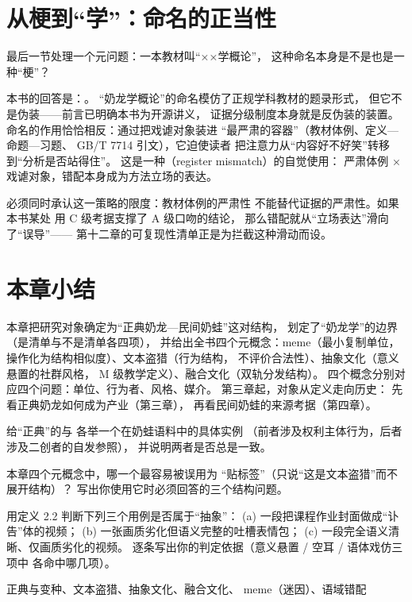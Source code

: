 \section{从梗到“学”：命名的正当性}\label{sec:02:legitimacy}

最后一节处理一个元问题：一本教材叫“××学概论”，
这种命名本身是不是也是一种“梗”？

本书的回答是：。
“奶龙学概论”的命名模仿了正规学科教材的题录形式，
但它不是伪装——前言已明确本书为开源讲义，
证据分级制度本身就是反伪装的装置。
命名的作用恰恰相反：通过把戏谑对象装进
“最严肃的容器”（教材体例、定义—命题—习题、
GB/T 7714 引文\cite{gbt7714_2015}），它迫使读者
把注意力从“内容好不好笑”转移到“分析是否站得住”。
这是一种（register mismatch）的自觉使用：
严肃体例 × 戏谑对象，错配本身成为方法立场的表达。

必须同时承认这一策略的限度：教材体例的严肃性
不能替代证据的严肃性。如果本书某处
用 C 级考据支撑了 A 级口吻的结论，
那么错配就从“立场表达”滑向了“误导”——
第十二章的可复现性清单正是为拦截这种滑动而设。

\section{本章小结}\label{sec:02:summary}

本章把研究对象确定为“正典奶龙—民间奶蛙”这对结构，
划定了“奶龙学”的边界（是清单与不是清单各四项），
并给出全书四个元概念：meme（最小复制单位，
操作化为结构相似度）、文本盗猎（行为结构，
不评价合法性）、抽象文化（意义悬置的社群风格，
M 级教学定义）、融合文化（双轨分发结构）。
四个概念分别对应四个问题：单位、行为者、风格、媒介。
第三章起，对象从定义走向历史：
先看正典奶龙如何成为产业（第三章），
再看民间奶蛙的来源考据（第四章）。

\begin{nlexercises}
  \item 给“正典”的与
        各举一个在奶蛙语料中的具体实例
        （前者涉及权利主体行为，后者涉及二创者的自发参照），
        并说明两者是否总是一致。
  \item 本章四个元概念中，哪一个最容易被误用为
        “贴标签”（只说“这是文本盗猎”而不展开结构）？
        写出你使用它时必须回答的三个结构问题。
  \item 用定义 2.2 判断下列三个用例是否属于“抽象”：
        (a) 一段把课程作业封面做成“讣告”体的视频；
        (b) 一张画质劣化但语义完整的吐槽表情包；
        (c) 一段完全语义清晰、仅画质劣化的视频。
        逐条写出你的判定依据（意义悬置 / 空耳 / 语体戏仿三项中
        各命中哪几项）。
\end{nlexercises}

\nlkeywords 正典与变种、文本盗猎、抽象文化、融合文化、
meme（迷因）、语域错配
